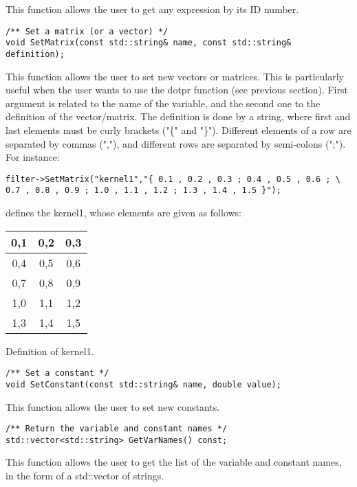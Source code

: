 This function allows the user to get any expression by its ID number.

\begin{verbatim}
/** Set a matrix (or a vector) */
void SetMatrix(const std::string& name, const std::string& definition);
\end{verbatim}

This function allows the user to set new vectors or matrices. This is particularly useful when the user wants to use the dotpr function (see previous section). First argument is related to the name of the variable, and the second one to the definition of the vector/matrix. The definition is done by a string, where first and last elements must be curly brackets ("\{" and "\}"). Different elements of a row are separated by commas (","), and different rows are separated by semi-colons (";"). For instance:

\begin{verbatim}
filter->SetMatrix("kernel1","{ 0.1 , 0.2 , 0.3 ; 0.4 , 0.5 , 0.6 ; \
0.7 , 0.8 , 0.9 ; 1.0 , 1.1 , 1.2 ; 1.3 , 1.4 , 1.5 }");
\end{verbatim}

defines the kernel1, whose elements are given as follows:

\begin{center} 
\begin{tabular}{|c|c|c|}
\hline
0,1	& 0,2	& 0,3 \\
\hline
0,4 &	0,5	& 0,6 \\
\hline
0,7 &	0,8	& 0,9 \\
\hline
1,0	& 1,1	& 1,2 \\
\hline
1,3	& 1,4	& 1,5 \\
\hline
\end{tabular}
\end{center}
\caption{Definition of kernel1.}
\label{correctness}

\begin{verbatim}
/** Set a constant */
void SetConstant(const std::string& name, double value);
\end{verbatim}

This function allows the user to set new constants.


\begin{verbatim}
/** Return the variable and constant names */
std::vector<std::string> GetVarNames() const;
\end{verbatim}

This function allows the user to get the list of the variable and constant names, in the form of a std::vector of strings.

